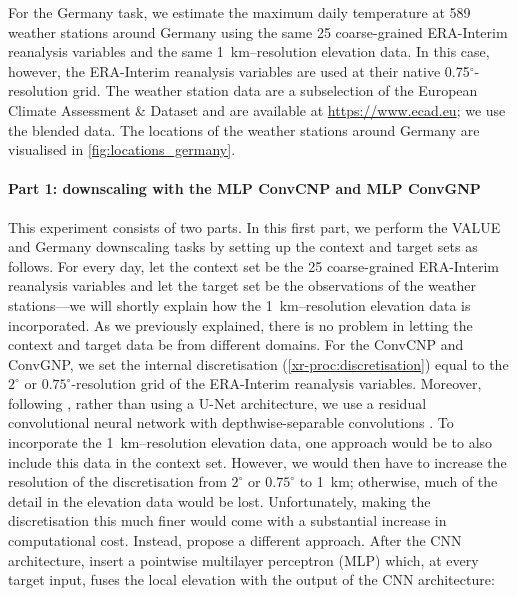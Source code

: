 \documentclass[12pt, twoside]{report}
\newcommand{\xrprefix}[1]{xr-#1}
\begin{document}
For the Germany task, we estimate the maximum daily temperature at 589 weather stations around Germany using the same 25 coarse-grained ERA-Interim reanalysis variables and the same \SI{1}{km}--resolution elevation data.
In this case, however, the ERA-Interim reanalysis variables are used at their native 0.75$^\circ$-resolution grid.
The weather station data are a subselection of the European Climate Assessment \& Dataset \parencite{Klein_Tank:2002:Daily_Dataset_of_20th-Century_Surface} and are available at \url{https://www.ecad.eu};
we use the blended data.
The locations of the weather stations around Germany are visualised in \cref{fig:locations_germany}.

\paragraph{Part 1: downscaling with the MLP ConvCNP and MLP ConvGNP}
This experiment consists of two parts.
In this first part, we perform the VALUE and Germany downscaling tasks by setting up the context and target sets as follows.
For every day,
let the context set be the 25 coarse-grained ERA-Interim reanalysis variables
and let the target set be the observations of the weather stations---we will shortly explain how the \SI{1}{km}--resolution elevation data is incorporated.
As we previously explained, there is no problem in letting the context and target data be from different domains.
For the ConvCNP and ConvGNP, we set the internal discretisation (\cref{\xrprefix{proc:discretisation}}) equal to the $2^\circ$ or $0.75^\circ$-resolution grid of the ERA-Interim reanalysis variables.
Moreover, following \textcite{Vaughan:2022:Convolutional_Conditional_Neural_Processes_for}, rather than using a U-Net architecture, we use a residual convolutional neural network  \parencite{He:2016:Deep_Residual_Learning_for_Image} with depthwise-separable convolutions \parencite{Chollet:2017:Xception_Deep_Learning_With_Depthwise}.
To incorporate the \SI{1}{km}--resolution elevation data, one approach would be to also include this data in the context set.
However, we would then have to increase the resolution of the discretisation from $2^\circ$ or $0.75^\circ$ to \SI{1}{km}; 
otherwise, much of the detail in the elevation data would be lost.
Unfortunately, making the discretisation this much finer would come with a substantial increase in computational cost.
Instead, \citeauthor{Vaughan:2022:Convolutional_Conditional_Neural_Processes_for} propose a different approach.
After the CNN architecture, insert a pointwise multilayer perceptron (MLP) which, at every target input, fuses the local elevation with the output of the CNN architecture:
\end{document}
